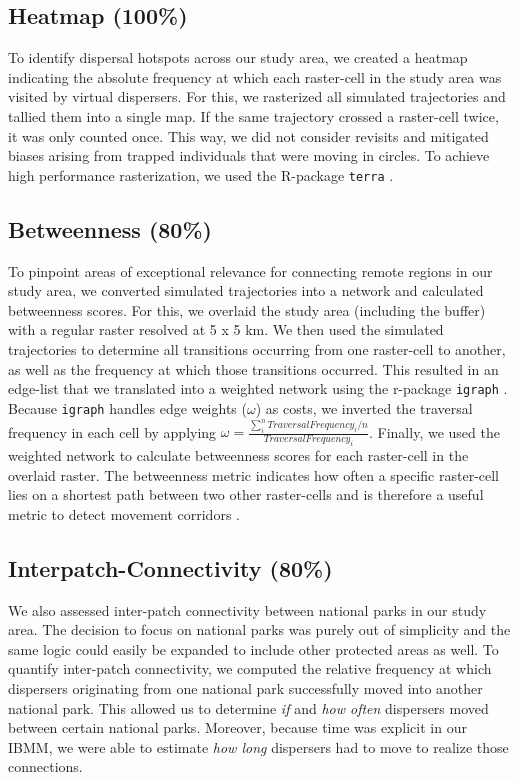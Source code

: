\documentclass[abstract=on,10pt,a4paper,bibliography=totocnumbered]{article}
\begin{document}
\subsection{Heatmap (100\%)}
To identify dispersal hotspots across our study area, we created a heatmap
indicating the absolute frequency at which each raster-cell in the study area
was visited by virtual dispersers. For this, we rasterized all simulated
trajectories and tallied them into a single map. If the same trajectory crossed
a raster-cell twice, it was only counted once. This way, we did not consider
revisits and mitigated biases arising from trapped individuals that were moving
in circles. To achieve high performance rasterization, we used the R-package
{\tt terra} \citep{Hijmans.2020}.

\subsection{Betweenness (80\%)}
To pinpoint areas of exceptional relevance for connecting remote regions in our
study area, we converted simulated trajectories into a network and calculated
betweenness scores. For this, we overlaid the study area (including the buffer)
with a regular raster resolved at 5 x 5 km. We then used the simulated
trajectories to determine all transitions occurring from one raster-cell to
another, as well as the frequency at which those transitions occurred. This
resulted in an edge-list that we translated into a weighted network using the
r-package {\tt igraph} \citep{Gabor.2006}. Because {\tt igraph} handles edge
weights (\(\omega\)) as costs, we inverted the traversal frequency in each cell
by applying \(\omega = \frac{\sum_i^n{Traversal Frequency_i}/n}{Traversal
Frequency_i}\). Finally, we used the weighted network to calculate betweenness
scores for each raster-cell in the overlaid raster. The betweenness metric
indicates how often a specific raster-cell lies on a shortest path between two
other raster-cells and is therefore a useful metric to detect movement corridors
\citep{BastilleRousseau.2018}.

\subsection{Interpatch-Connectivity (80\%)}
We also assessed inter-patch connectivity between national parks in our study
area. The decision to focus on national parks was purely out of simplicity and
the same logic could easily be expanded to include other protected areas as
well. To quantify inter-patch connectivity, we computed the relative frequency
at which dispersers originating from one national park successfully moved into
another national park. This allowed us to determine \textit{if} and \textit{how
often} dispersers moved between certain national parks. Moreover, because time
was explicit in our IBMM, we were able to estimate \textit{how long} dispersers
had to move to realize those connections.
\end{document}
